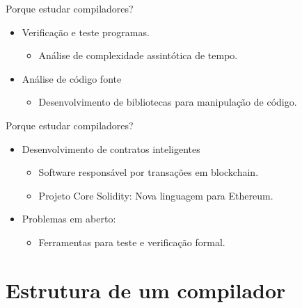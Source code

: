 \begin{frame}{Porque estudar compiladores?}

    \begin{itemize}

        \item
        Verificação e teste programas.

        \begin{itemize}

            \item
            Análise de complexidade assintótica de tempo.
        \end{itemize}
        \item
        Análise de código fonte

        \begin{itemize}

            \item
            Desenvolvimento de bibliotecas para manipulação de código.
        \end{itemize}
    \end{itemize}
\end{frame}

\begin{frame}{Porque estudar compiladores?}

    \begin{itemize}

        \item
        Desenvolvimento de contratos inteligentes

        \begin{itemize}

            \item
            Software responsável por transações em blockchain.
            \item
            Projeto Core Solidity: Nova linguagem para Ethereum.
        \end{itemize}
        \item
        Problemas em aberto:

        \begin{itemize}

            \item
            Ferramentas para teste e verificação formal.
        \end{itemize}
    \end{itemize}
\end{frame}


\section{Estrutura de um compilador}\label{estrutura-de-um-compilador}

